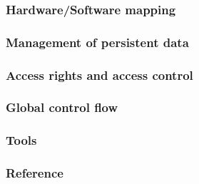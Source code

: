 \subsubsection{Hardware/Software mapping}
\subsubsection{Management of persistent data}
\subsubsection{Access rights and access control}
\subsubsection{Global control flow}
\subsubsection{Tools}
\subsubsection{Reference}
